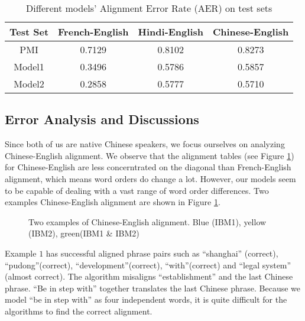 \documentclass[letterpaper]{article}
\begin{document}
\begin{table}
\begin{center}
\begin{tabular}{cccc}
\hline
\textbf{Test Set} & French-English & Hindi-English & Chinese-English \\
\hline
PMI & 0.7129 & 0.8102 & 0.8273 \\
Model1 & 0.3496 &  0.5786 &   0.5857 \\
Model2 & 0.2858 & 0.5777 & 0.5710 \\
\hline
\end{tabular}
\caption{Different models' Alignment Error Rate (AER) on test sets}\label{tab:test_result}
\end{center}
\end{table}

\subsection{Error Analysis and Discussions}
Since both of us are native Chinese speakers, we focus ourselves on analyzing Chinese-English alignment. We observe that the alignment tables (see Figure \ref{img:align}) for Chinese-English are less concerntrated on the diagonal than French-English alignment, which means word orders do change a lot.
However, our models seem to be capable of dealing with a vast range of word order differences.
Two examples Chinese-English alignment are shown in Figure \ref{img:align}.
\begin{figure}
\begin{center}
\caption{Two examples of Chinese-English alignment. Blue (IBM1), yellow (IBM2), green(IBM1 \& IBM2)}\label{img:align}
\end{center}
\end{figure}
Example $1$ has successful aligned phrase pairs such as ``shanghai'' (correct), ``pudong''(correct), ``development''(correct), ``with''(correct) and ``legal system'' (almost correct). The algorithm misaligns ``establishment'' and the last Chinese phrase. ``Be in step with'' together translates the last Chinese phrase. Because we model ``be in step with'' as four independent words, it is quite difficult for the algorithms to find the correct alignment.
\end{document}
